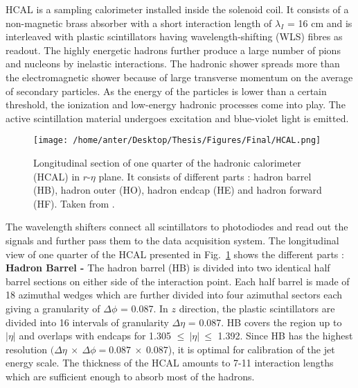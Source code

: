HCAL is a sampling calorimeter installed inside the solenoid coil. It consists of a non-magnetic brass absorber with a short interaction length of $\lambda_I$ = 16 cm and is interleaved with plastic scintillators having wavelength-shifting (WLS) fibres as readout. The highly energetic hadrons further produce a large number of pions and nucleons by inelastic interactions. The hadronic shower spreads more than the electromagnetic shower because of large transverse momentum on the average of secondary particles. As the energy of the particles is lower than a certain threshold, the ionization and low-energy hadronic processes come into play. The active scintillation material undergoes excitation and blue-violet light is emitted. 
\begin{figure}[!h]
\begin{center}
\vspace*{3mm} 
\hspace*{-5mm}
\texttt{[image: /home/anter/Desktop/Thesis/Figures/Final/HCAL.png]}\\
\vspace*{4mm}
\caption[Longitudinal section of one quarter of the hadronic calorimeter (HCAL) in $r$-$\eta$ plane.]{Longitudinal section of one quarter of the hadronic calorimeter (HCAL) in $r$-$\eta$ plane. It consists of different parts : hadron barrel (HB), hadron outer (HO), hadron endcap (HE) and hadron forward (HF). Taken from \cite{Chatrchyan:2008aa}.}
\label{fig:hcal}
\end{center}
\end{figure}
The wavelength shifters connect all scintillators to photodiodes and read out the signals and further pass them to the data acquisition system. The longitudinal view of one quarter of the HCAL presented in Fig.~\ref{fig:hcal} shows the different parts : \\\newline
{\bf Hadron Barrel -} The hadron barrel (HB) is divided into two identical half barrel sections on either side of the interaction point. Each half barrel is made of 18 azimuthal wedges which are further divided into four azimuthal sectors each giving a granularity of $\Delta\phi$ = 0.087. In $z$ direction, the plastic scintillators are divided into 16 intervals of granularity $\Delta\eta$ = 0.087. HB covers the region up to $|\eta|$  and overlaps with endcaps for 1.305 $\leq~|\eta|~\leq$ 1.392. Since HB has the highest resolution $(\Delta\eta~\times~\Delta\phi = 0.087~\times~0.087$), it is optimal for calibration of the jet energy scale. The thickness of the HCAL amounts to 7-11 interaction lengths which are sufficient enough to absorb most of the hadrons.\\\newline

